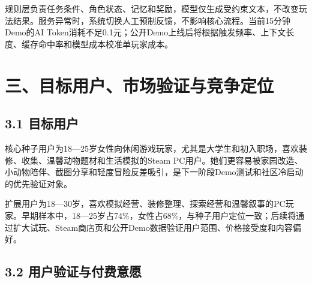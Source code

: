 \documentclass[UTF8,fontset=none,zihao=5,twoside]{ctexart}
\begin{document}
规则层负责任务条件、角色状态、记忆和奖励，模型仅生成受约束文本，不改变玩法结果。服务异常时，系统切换人工预制反馈，不影响核心流程。当前15分钟Demo的AI Token消耗不足0.1元；公开Demo上线后将根据触发频率、上下文长度、缓存命中率和模型成本校准单玩家成本。

\section{三、目标用户、市场验证与竞争定位}\label{ux4e09ux76eeux6807ux7528ux6237ux5e02ux573aux9a8cux8bc1ux4e0eux7adeux4e89ux5b9aux4f4d}

\subsection{3.1 目标用户}\label{31-ux76eeux6807ux7528ux6237}

核心种子用户为18---25岁女性向休闲游戏玩家，尤其是大学生和初入职场，喜欢装修、收集、温馨动物题材和生活模拟的Steam PC用户。她们更容易被家园改造、小动物陪伴、截图分享和轻度冒险反差吸引，是下一阶段Demo测试和社区冷启动的优先验证对象。

扩展用户为18---30岁，喜欢模拟经营、装修整理、探索经营和温馨叙事的PC玩家。早期样本中，18---25岁占74\%，女性占68\%，与种子用户定位一致；后续将通过扩大试玩、Steam商店页和公开Demo数据验证用户范围、价格接受度和内容偏好。

\subsection{3.2 用户验证与付费意愿}\label{32-ux7528ux6237ux9a8cux8bc1ux4e0eux4ed8ux8d39ux610fux613f}
\end{document}
